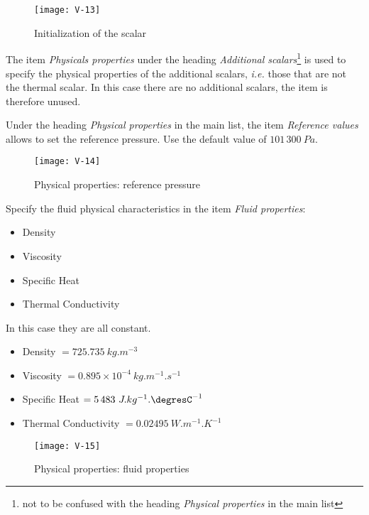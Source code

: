 \begin{figure}[ht]
\begin{center}
\texttt{[image: V-13]}
\caption{Initialization of the scalar}
\label{fig16_e1}
\end{center}
\end{figure}

The item {\itshape Physicals properties} under the heading {\itshape Additional
scalars}\footnote{not to be confused with the heading {\itshape Physical
properties} in the main list} is used to specify the physical properties
of the additional scalars, {\em i.e.} those that are not the thermal scalar. In
this case there are no additional scalars, the item is therefore unused.


\clearpage
Under the heading {\itshape Physical properties} in the main list,
the item {\itshape Reference values} allows to set the reference pressure.
Use the default value of $101\,300\ Pa$.

\begin{figure}[ht]
\begin{center}
\texttt{[image: V-14]}
\caption{Physical properties: reference pressure}
\label{fig17_e1}
\end{center}
\end{figure}


\clearpage
Specify the fluid physical characteristics in the item {\itshape Fluid
properties}:
\begin{itemize}
        \item Density
        \item Viscosity
        \item Specific Heat
        \item Thermal Conductivity
\end{itemize}

In this case they are all constant.
\begin{itemize}
        \item Density $ = 725.735\ kg.m^{-3}$
        \item Viscosity $ = 0.895\times 10^{-4}\ kg.m^{-1}.s^{-1}$
        \item Specific Heat $  = 5\,483\ J.kg^{-1}.\mbox{\degresC}^{-1}$
        \item Thermal Conductivity $ = 0.02495\ W.m^{-1}.K^{-1}$
\end{itemize}

\begin{figure}[ht]
\begin{center}
\texttt{[image: V-15]}
\caption{Physical properties: fluid properties}
\label{fig18_e1}
\end{center}
\end{figure}



